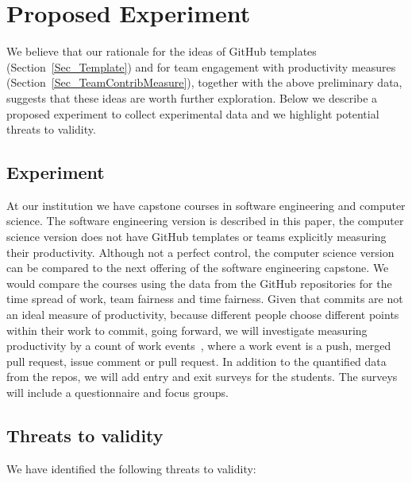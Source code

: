 \documentclass[10pt, conference]{IEEEtran}
\begin{document}
\section{Proposed Experiment} \label{SecProposedExperiment}

We believe that our rationale for the ideas of GitHub templates
(Section~\ref{Sec_Template}) and for team engagement with productivity measures
(Section~\ref{Sec_TeamContribMeasure}), together with the above preliminary
data, suggests that these ideas are worth further exploration.  Below we
describe a proposed experiment to collect experimental data and we highlight
potential threats to validity.

\subsection{Experiment}

At our institution we have capstone courses in software engineering and computer
science. The software engineering version is described in this paper, the
computer science version does not have GitHub templates or teams explicitly
measuring their productivity.  Although not a perfect control, the computer
science version can be compared to the next offering of the software engineering
capstone.  We would compare the courses using the data from the GitHub
repositories for the time spread of work, team fairness and time fairness.
Given that commits are not an ideal measure of productivity, because different
people choose different points within their work to commit, going forward, we
will investigate measuring productivity by a count of work
events~\cite{saadatAnalyzingProductivityGitHub2020}, where a work event is a
push, merged pull request, issue comment or pull request.  In addition to the
quantified data from the repos, we will add entry and exit surveys for the
students. The surveys will include a questionnaire and focus groups.

\subsection{Threats to validity}

We have identified the following threats to validity:
\end{document}
